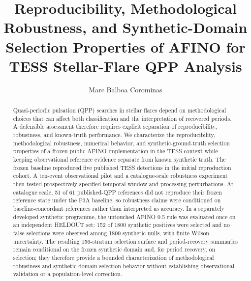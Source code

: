 \documentclass[manuscript,linenumbers]{aastex702}
\begin{document}
\title{Reproducibility, Methodological Robustness, and Synthetic-Domain Selection Properties of AFINO for TESS Stellar-Flare QPP Analysis}
\author[0009-0006-7571-9193,gname=Marc,sname='Balboa Corominas']{Marc Balboa Corominas}

\begin{abstract}
Quasi-periodic pulsation (QPP) searches in stellar flares depend on methodological choices that can affect both classification and the interpretation of recovered periods. A defensible assessment therefore requires explicit separation of reproducibility, robustness, and known-truth performance. We characterize the reproducibility, methodological robustness, numerical behavior, and synthetic-ground-truth selection properties of a frozen public AFINO implementation in the TESS context while keeping observational reference evidence separate from known synthetic truth. The frozen baseline reproduced five published TESS detections in the initial reproduction cohort. A ten-event observational pilot and a catalogue-scale robustness experiment then tested prospectively specified temporal-window and processing perturbations. At catalogue scale, 51 of 61 published-QPP references did not reproduce their frozen reference state under the F3A baseline, so robustness claims were conditioned on baseline-concordant references rather than interpreted as accuracy. In a separately developed synthetic programme, the untouched AFINO 0.5 rule was evaluated once on an independent HELDOUT set: 152 of 1800 synthetic positives were selected and no false selections were observed among 1800 synthetic nulls, with finite Wilson uncertainty. The resulting 156-stratum selection surface and period-recovery summaries remain conditional on the frozen synthetic domain and, for period recovery, on selection; they therefore provide a bounded characterization of methodological robustness and synthetic-domain selection behavior without establishing observational validation or a population-level correction.
\end{abstract}
\end{document}

